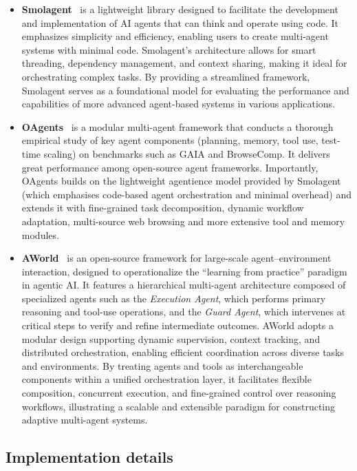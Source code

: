 \begin{itemize}[left=0pt]
    \item \textbf{Smolagent}~\citep{smolagents} is a lightweight library designed to facilitate the development and implementation of AI agents that can think and operate using code. It emphasizes simplicity and efficiency, enabling users to create multi-agent systems with minimal code. Smolagent's architecture allows for smart threading, dependency management, and context sharing, making it ideal for orchestrating complex tasks. By providing a streamlined framework, Smolagent serves as a foundational model for evaluating the performance and capabilities of more advanced agent-based systems in various applications.
    \item \textbf{OAgents}~\citep{zhu2025oagentsempiricalstudybuilding} is a modular multi-agent framework that conducts a thorough empirical study of key agent components (planning, memory, tool use, test-time scaling) on benchmarks such as GAIA and BrowseComp. It delivers great performance among open-source agent frameworks. Importantly, OAgents builds on the lightweight agentience model provided by Smolagent (which emphasises code-based agent orchestration and minimal overhead) and extends it with fine-grained task decomposition, dynamic workflow adaptation, multi-source web browsing and more extensive tool and memory modules.
    \item \textbf{AWorld}~\citep{yu2025aworldorchestratingtrainingrecipe} is an open-source framework for large-scale agent–environment interaction, designed to operationalize the “learning from practice” paradigm in agentic AI. It features a hierarchical multi-agent architecture composed of specialized agents such as the \emph{Execution Agent}, which performs primary reasoning and tool-use operations, and the \emph{Guard Agent}, which intervenes at critical steps to verify and refine intermediate outcomes. AWorld adopts a modular design supporting dynamic supervision, context tracking, and distributed orchestration, enabling efficient coordination across diverse tasks and environments. By treating agents and tools as interchangeable components within a unified orchestration layer, it facilitates flexible composition, concurrent execution, and fine-grained control over reasoning workflows, illustrating a scalable and extensible paradigm for constructing adaptive multi-agent systems.
\end{itemize}



\subsection{Implementation details}
\label{implementation_details}

